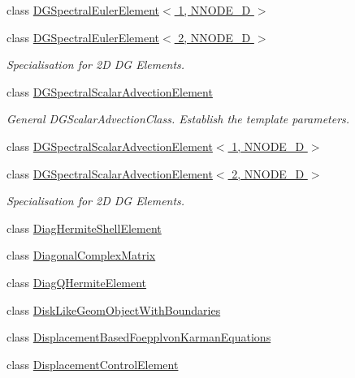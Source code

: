 \begin{DoxyCompactItemize}
class \hyperlink{classoomph_1_1DGSpectralEulerElement_3_011_00_01NNODE__1D_01_4}{D\+G\+Spectral\+Euler\+Element$<$ 1, N\+N\+O\+D\+E\+\_\+D $>$}
\item 
class \hyperlink{classoomph_1_1DGSpectralEulerElement_3_012_00_01NNODE__1D_01_4}{D\+G\+Spectral\+Euler\+Element$<$ 2, N\+N\+O\+D\+E\+\_\+D $>$}
\begin{DoxyCompactList}\small\item\em Specialisation for 2D DG Elements. \end{DoxyCompactList}\item 
class \hyperlink{classoomph_1_1DGSpectralScalarAdvectionElement}{D\+G\+Spectral\+Scalar\+Advection\+Element}
\begin{DoxyCompactList}\small\item\em General D\+G\+Scalar\+Advection\+Class. Establish the template parameters. \end{DoxyCompactList}\item 
class \hyperlink{classoomph_1_1DGSpectralScalarAdvectionElement_3_011_00_01NNODE__1D_01_4}{D\+G\+Spectral\+Scalar\+Advection\+Element$<$ 1, N\+N\+O\+D\+E\+\_\+D $>$}
\item 
class \hyperlink{classoomph_1_1DGSpectralScalarAdvectionElement_3_012_00_01NNODE__1D_01_4}{D\+G\+Spectral\+Scalar\+Advection\+Element$<$ 2, N\+N\+O\+D\+E\+\_\+D $>$}
\begin{DoxyCompactList}\small\item\em Specialisation for 2D DG Elements. \end{DoxyCompactList}\item 
class \hyperlink{classoomph_1_1DiagHermiteShellElement}{Diag\+Hermite\+Shell\+Element}
\item 
class \hyperlink{classoomph_1_1DiagonalComplexMatrix}{Diagonal\+Complex\+Matrix}
\item 
class \hyperlink{classoomph_1_1DiagQHermiteElement}{Diag\+Q\+Hermite\+Element}
\item 
class \hyperlink{classoomph_1_1DiskLikeGeomObjectWithBoundaries}{Disk\+Like\+Geom\+Object\+With\+Boundaries}
\item 
class \hyperlink{classoomph_1_1DisplacementBasedFoepplvonKarmanEquations}{Displacement\+Based\+Foepplvon\+Karman\+Equations}
\item 
class \hyperlink{classoomph_1_1DisplacementControlElement}{Displacement\+Control\+Element}

\end{DoxyCompactItemize}
